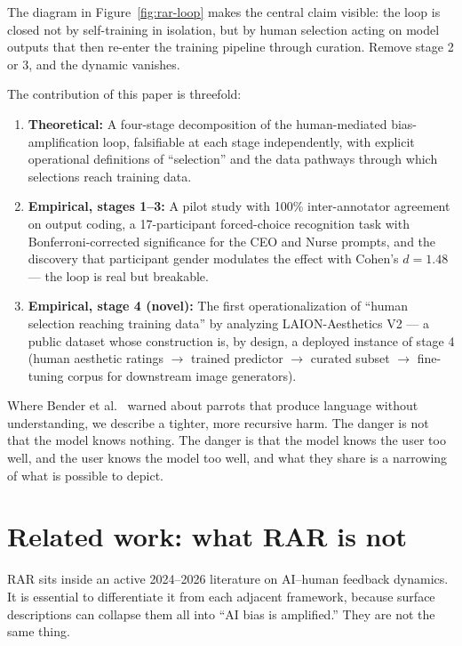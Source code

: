 \documentclass[sigconf,nonacm]{acmart}
\begin{document}
The diagram in Figure~\ref{fig:rar-loop} makes the central claim visible: the loop is closed not by self-training in isolation, but by human selection acting on model outputs that then re-enter the training pipeline through curation. Remove stage 2 or 3, and the dynamic vanishes.

The contribution of this paper is threefold:

\begin{enumerate}
  \item \textbf{Theoretical:} A four-stage decomposition of the human-mediated bias-amplification loop, falsifiable at each stage independently, with explicit operational definitions of ``selection'' and the data pathways through which selections reach training data.
  \item \textbf{Empirical, stages 1--3:} A pilot study with 100\% inter-annotator agreement on output coding, a 17-participant forced-choice recognition task with Bonferroni-corrected significance for the CEO and Nurse prompts, and the discovery that participant gender modulates the effect with Cohen's \(d = 1.48\) --- the loop is real but breakable.
  \item \textbf{Empirical, stage 4 (novel):} The first operationalization of ``human selection reaching training data'' by analyzing LAION-Aesthetics V2 --- a public dataset whose construction is, by design, a deployed instance of stage 4 (human aesthetic ratings \(\rightarrow\) trained predictor \(\rightarrow\) curated subset \(\rightarrow\) fine-tuning corpus for downstream image generators).
\end{enumerate}

Where Bender et al.~\cite{bender2021dangers} warned about parrots that produce language without understanding, we describe a tighter, more recursive harm. The danger is not that the model knows nothing. The danger is that the model knows the user too well, and the user knows the model too well, and what they share is a narrowing of what is possible to depict.

\section{Related work: what RAR is not}

RAR sits inside an active 2024--2026 literature on AI--human feedback dynamics. It is essential to differentiate it from each adjacent framework, because surface descriptions can collapse them all into ``AI bias is amplified.'' They are not the same thing.
\end{document}
